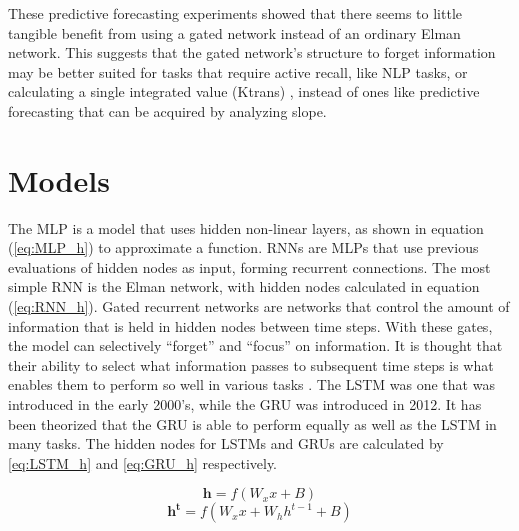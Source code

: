 \documentclass[11pt]{article}
\begin{document}
These predictive forecasting experiments showed that there seems to
little tangible benefit from using a gated network instead of an
ordinary Elman network. This suggests that
the gated network's structure to forget information may be
better suited for tasks that require active recall, like NLP tasks, or
calculating a single integrated value (Ktrans) , instead of ones like
predictive forecasting that can be acquired by analyzing slope. %

\section{Models}
The MLP is a model that uses hidden non-linear
layers, as shown in equation (\ref{eq:MLP_h})
to approximate a function. RNNs are MLPs that use previous evaluations
of hidden nodes as input, forming recurrent connections. The most
simple RNN is the Elman network, with hidden nodes calculated in
equation (\ref{eq:RNN_h}).
Gated recurrent networks are networks that control the
amount of information that is held in hidden nodes between time
steps. With these gates, the model can selectively ``forget''
and ``focus'' on information. It is thought that their ability to select what information
passes to subsequent time steps is what enables them to perform so
well in various tasks \cite{}. The LSTM was one that was introduced in the early
2000's, while the GRU was introduced in 2012. It has been theorized
that the GRU is able to perform equally as well as the LSTM in many tasks. 
The hidden nodes for
LSTMs and GRUs are calculated by \ref{eq:LSTM_h} and \ref{eq:GRU_h}
respectively.

\begin{equation}
\mathbf{h} = f( W_xx+B)
\label{eq:MLP_h}
\end{equation}
\begin{equation}
\mathbf{h^t} = f(W_xx+W_hh^{t-1}+B)
\label{eq:RNN_h}
\end{equation}
\end{document}
